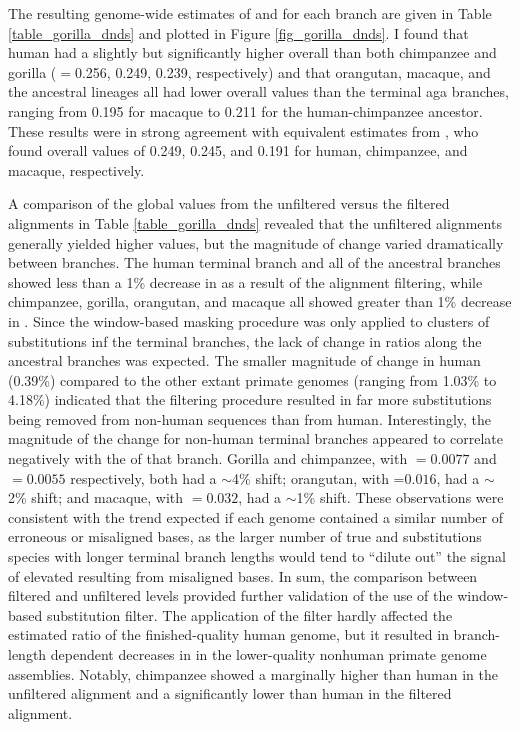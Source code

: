 The resulting genome-wide estimates of \ds and \dnds for each branch
are given in Table \ref{table_gorilla_dnds} and plotted in Figure
\ref{fig_gorilla_dnds}. I found that human had a slightly but
significantly higher overall \dnds than both chimpanzee and gorilla
(\dnds$=$0.256, 0.249, 0.239, respectively) and that orangutan,
macaque, and the ancestral lineages all had lower overall \dnds values
than the terminal \ac{aga} branches, ranging from 0.195 for macaque to
0.211 for the human-chimpanzee ancestor. These results were in strong
agreement with equivalent estimates from \citet{Kosiol2008}, who found
overall \dnds values of 0.249, 0.245, and 0.191 for human, chimpanzee,
and macaque, respectively.

A comparison of the global \dnds values from the unfiltered versus the
filtered alignments in Table \ref{table_gorilla_dnds} revealed that
the unfiltered alignments generally yielded higher \dnds values, but
the magnitude of change varied dramatically between branches. The
human terminal branch and all of the ancestral branches showed less
than a 1\% decrease in \dnds as a result of the alignment filtering,
while chimpanzee, gorilla, orangutan, and macaque all showed greater
than 1\% decrease in \dnds. Since the window-based masking procedure
was only applied to clusters of substitutions inf the terminal
branches, the lack of change in \dnds ratios along the ancestral
branches was expected. The smaller magnitude of change in human
(0.39\%) compared to the other extant primate genomes (ranging from
1.03\% to 4.18\%) indicated that the filtering procedure resulted in
far more \nsyn substitutions being removed from non-human sequences
than from human. Interestingly, the magnitude of the \dnds change for
non-human terminal branches appeared to correlate negatively with the
\ds of that branch. Gorilla and chimpanzee, with \ds$=0.0077$ and
\ds$=0.0055$ respectively, both had a $\sim$4\% shift; orangutan, with
\ds=$0.016$, had a $\sim$2\% shift; and macaque, with \ds$=0.032$, had
a $\sim$1\% shift. These observations were consistent with the trend
expected if each genome contained a similar number of erroneous or
misaligned bases, as the larger number of true \nsyn and \syn
substitutions species with longer terminal branch lengths would tend
to ``dilute out'' the signal of elevated \dnds resulting from
misaligned bases. In sum, the comparison between filtered and
unfiltered \dnds levels provided further validation of the use of the
window-based substitution filter. The application of the filter hardly
affected the estimated \dnds ratio of the finished-quality human
genome, but it resulted in branch-length dependent decreases in \dnds
in the lower-quality nonhuman primate genome assemblies. Notably,
chimpanzee showed a marginally higher \dnds than human in the
unfiltered alignment and a significantly lower \dnds than human in the
filtered alignment.

